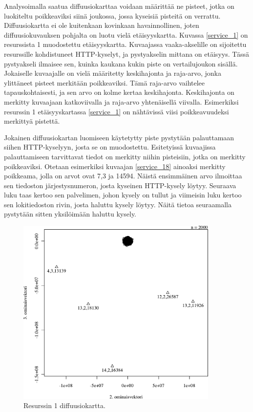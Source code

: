 Analysoimalla saatua diffuusiokarttaa voidaan määrittää ne pisteet, jotka on luokiteltu poikkeaviksi siinä joukossa, jossa kyseisiä pisteitä on 
verrattu. Diffuusiokartta ei ole kuitenkaan kovinkaan havainnollinen, joten diffuusiokuvauksen pohjalta on luotu vielä etäisyyskartta. Kuvassa
\ref{service_1} on resurssista 1 muodostettu etäisyyskartta. Kuvaajassa vaaka-akselille on sijoitettu resurssille kohdistuneet HTTP-kyselyt,
ja pystyakselin mittana on etäisyys. Tässä pystyakseli ilmaisee sen, kuinka kaukana kukin piste on vertailujoukon sisällä. Jokaiselle kuvaajalle
on vielä määritetty keskihajonta ja raja-arvo, jonka ylittäneet pisteet merkitään poikkeaviksi. Tämä raja-arvo vaihtelee tapauskohtaisesti, ja sen
arvo on kolme kertaa keskihajonta. Keskihajonta on merkitty kuvaajaan katkoviivalla ja raja-arvo yhtenäisellä viivalla. Esimerkiksi resurssin 1 
etäisyyskartassa \ref{service_1} on nähtävissä viisi poikkeavuudeksi merkittyä pistettä.

Jokainen diffuusiokartan luomiseen käytetytty piste pystytään palauttamaan siihen HTTP-kyselyyn, josta se on muodostettu. Esitetyissä kuvaajissa
palauttamiseen tarvittavat tiedot on merkitty niihin pisteisiin, jotka on merkitty poikkeaviksi. Otetaan esimerkiksi kuvaajan \ref{service_18}
ainoaksi merkitty poikkeama, jolla on arvot ovat 7,3 ja 14594. Näistä ensimmäinen arvo ilmoittaa sen tiedoston järjestysnumeron, josta kyseinen 
HTTP-kysely löytyy. Seuraava luku taas kertoo sen palvelimen, johon kysely on tullut ja viimeisin luku kertoo sen lokitiedoston rivin, josta
haluttu kysely löytyy. Näitä tietoa seuraamalla pystytään sitten yksilöimään haluttu kysely.
   
\begin{figure}[p]
\centering
\includegraphics[width=10cm]{pics/diffuusiokuvat/service_1.pdf}
\caption{Resurssin 1 diffuusiokartta.}
\label{diffusio_1}
\end{figure}

